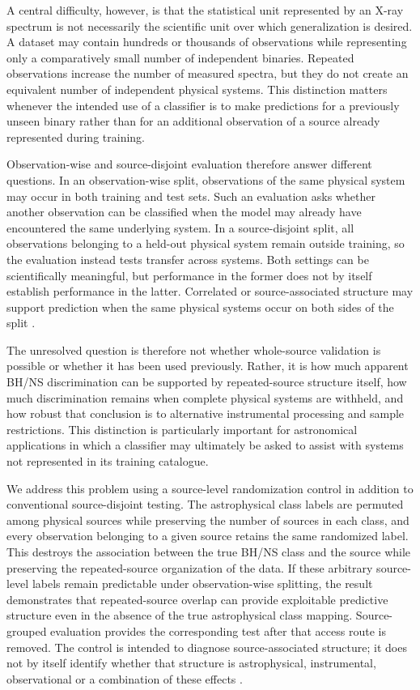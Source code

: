\documentclass[final,5p,authoryear,nopreprintline]{elsarticle}
\begin{document}
A central difficulty, however, is that the statistical unit represented by an X-ray spectrum is not necessarily the scientific unit over which generalization is desired. A dataset may contain hundreds or thousands of observations while representing only a comparatively small number of independent binaries. Repeated observations increase the number of measured spectra, but they do not create an equivalent number of independent physical systems. This distinction matters whenever the intended use of a classifier is to make predictions for a previously unseen binary rather than for an additional observation of a source already represented during training.

Observation-wise and source-disjoint evaluation therefore answer different questions. In an observation-wise split, observations of the same physical system may occur in both training and test sets. Such an evaluation asks whether another observation can be classified when the model may already have encountered the same underlying system. In a source-disjoint split, all observations belonging to a held-out physical system remain outside training, so the evaluation instead tests transfer across systems. Both settings can be scientifically meaningful, but performance in the former does not by itself establish performance in the latter. Correlated or source-associated structure may support prediction when the same physical systems occur on both sides of the split \citep{Pattnaik2021,Wright2015,Neto2019}.

The unresolved question is therefore not whether whole-source validation is possible or whether it has been used previously. Rather, it is how much apparent BH/NS discrimination can be supported by repeated-source structure itself, how much discrimination remains when complete physical systems are withheld, and how robust that conclusion is to alternative instrumental processing and sample restrictions. This distinction is particularly important for astronomical applications in which a classifier may ultimately be asked to assist with systems not represented in its training catalogue.

We address this problem using a source-level randomization control in addition to conventional source-disjoint testing. The astrophysical class labels are permuted among physical sources while preserving the number of sources in each class, and every observation belonging to a given source retains the same randomized label. This destroys the association between the true BH/NS class and the source while preserving the repeated-source organization of the data. If these arbitrary source-level labels remain predictable under observation-wise splitting, the result demonstrates that repeated-source overlap can provide exploitable predictive structure even in the absence of the true astrophysical class mapping. Source-grouped evaluation provides the corresponding test after that access route is removed. The control is intended to diagnose source-associated structure; it does not by itself identify whether that structure is astrophysical, instrumental, observational or a combination of these effects \citep{Neto2019}.
\end{document}
